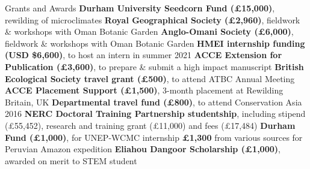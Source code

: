 \begin{rubric}{Grants and Awards}
\entry*[2022] \textbf{Durham University Seedcorn Fund (£15,000)}, rewilding of microclimates
\entry*[2022] \textbf{Royal Geographical Society (£2,960)}, fieldwork \& workshops with Oman Botanic Garden
\entry*[2022] \textbf{Anglo-Omani Society (£6,000)}, fieldwork \& workshops with Oman Botanic Garden
\entry*[2021] \textbf{HMEI internship funding (USD \$6,600)}, to host an intern in summer 2021
\entry*[2018] \textbf{ACCE Extension for Publication (£3,600)}, to prepare \& submit a high impact manuscript
\entry*[2018] \textbf{British Ecological Society travel grant (£500)}, to attend ATBC Annual Meeting
\entry*[2016] \textbf{ACCE Placement Support (£1,500)}, 3-month placement at Rewilding Britain, UK
\entry*[2016] \textbf{Departmental travel fund (£800)}, to attend Conservation Asia 2016
\entry*[2014] \textbf{NERC Doctoral Training Partnership studentship}, including stipend (£55,452), research and training grant (£11,000) and fees (£17,484)
\entry*[2013] \textbf{Durham Fund (£1,000)}, for UNEP-WCMC internship
\entry*[2011] \textbf{£1,300} from various sources for Peruvian Amazon expedition
\entry*[2010] \textbf{Eliahou Dangoor Scholarship (£1,000)}, awarded on merit to STEM student
\end{rubric}